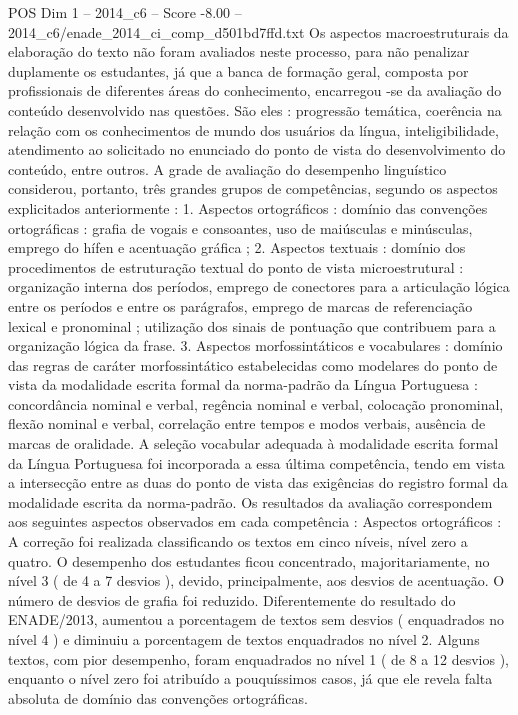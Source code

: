 \begin{textsample}{POS Dim 1 – 2014\_c6 – Score -8.00 – 2014\_c6/enade\_2014\_ci\_comp\_d501bd7ffd.txt}
Os aspectos macroestruturais da elaboração do texto não foram avaliados neste processo, para não penalizar duplamente os estudantes, já que a banca de formação geral, composta por profissionais de diferentes áreas do conhecimento, encarregou -se da avaliação do conteúdo desenvolvido nas questões.
São eles : progressão temática, coerência na relação com os conhecimentos de mundo dos usuários da língua, inteligibilidade, atendimento ao solicitado no enunciado do ponto de vista do desenvolvimento do conteúdo, entre outros.
A grade de avaliação do desempenho linguístico considerou, portanto, três grandes grupos de competências, segundo os aspectos explicitados anteriormente : 1.
Aspectos ortográficos : domínio das convenções ortográficas : grafia de vogais e consoantes, uso de maiúsculas e minúsculas, emprego do hífen e acentuação gráfica ; 2.
Aspectos textuais : domínio dos procedimentos de estruturação textual do ponto de vista microestrutural : organização interna dos períodos, emprego de conectores para a articulação lógica entre os períodos e entre os parágrafos, emprego de marcas de referenciação lexical e pronominal ; utilização dos sinais de pontuação que contribuem para a organização lógica da frase. 3.
Aspectos morfossintáticos e vocabulares : domínio das regras de caráter morfossintático estabelecidas como modelares do ponto de vista da modalidade escrita formal da norma-padrão da Língua Portuguesa : concordância nominal e verbal, regência nominal e verbal, colocação pronominal, flexão nominal e verbal, correlação entre tempos e modos verbais, ausência de marcas de oralidade.
A seleção vocabular adequada à modalidade escrita formal da Língua Portuguesa foi incorporada a essa última competência, tendo em vista a intersecção entre as duas do ponto de vista das exigências do registro formal da modalidade escrita da norma-padrão.
Os resultados da avaliação correspondem aos seguintes aspectos observados em cada competência : Aspectos ortográficos : A correção foi realizada classificando os textos em cinco níveis, nível zero a quatro.
O desempenho dos estudantes ficou concentrado, majoritariamente, no nível 3 ( de 4 a 7 desvios ), devido, principalmente, aos desvios de acentuação.
O número de desvios de grafia foi reduzido.
Diferentemente do resultado do ENADE/2013, aumentou a porcentagem de textos sem desvios ( enquadrados no nível 4 ) e diminuiu a porcentagem de textos enquadrados no nível 2.
Alguns textos, com pior desempenho, foram enquadrados no nível 1 ( de 8 a 12 desvios ), enquanto o nível zero foi atribuído a pouquíssimos casos, já que ele revela falta absoluta de domínio das convenções ortográficas.

\end{textsample}
